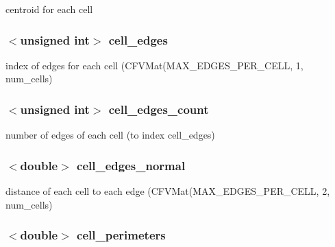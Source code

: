centroid for each cell 

\hypertarget{classFVL_1_1CFVMesh2D_a088a198cb26befce9c0f1cab67e00705}{
\subsubsection[{cell\_\-edges}]{$<$unsigned int$>$ {\bf cell\_\-edges}}}
\label{da/d8d/classFVL_1_1CFVMesh2D_a088a198cb26befce9c0f1cab67e00705}


index of edges for each cell (CFVMat(MAX\_\-EDGES\_\-PER\_\-CELL, 1, num\_\-cells) 

\hypertarget{classFVL_1_1CFVMesh2D_ac40c328fe38b4afc77363050e278bcce}{
\subsubsection[{cell\_\-edges\_\-count}]{$<$unsigned int$>$ {\bf cell\_\-edges\_\-count}}}
\label{da/d8d/classFVL_1_1CFVMesh2D_ac40c328fe38b4afc77363050e278bcce}


number of edges of each cell (to index cell\_\-edges) 

\hypertarget{classFVL_1_1CFVMesh2D_a1dc398446290133710b75ca776d4abda}{
\subsubsection[{cell\_\-edges\_\-normal}]{$<$double$>$ {\bf cell\_\-edges\_\-normal}}}
\label{da/d8d/classFVL_1_1CFVMesh2D_a1dc398446290133710b75ca776d4abda}


distance of each cell to each edge (CFVMat(MAX\_\-EDGES\_\-PER\_\-CELL, 2, num\_\-cells) 

\hypertarget{classFVL_1_1CFVMesh2D_a9b0f6ae0e30a2b7dedfeba13d4590fe3}{
\subsubsection[{cell\_\-perimeters}]{$<$double$>$ {\bf cell\_\-perimeters}}}
\label{da/d8d/classFVL_1_1CFVMesh2D_a9b0f6ae0e30a2b7dedfeba13d4590fe3}


